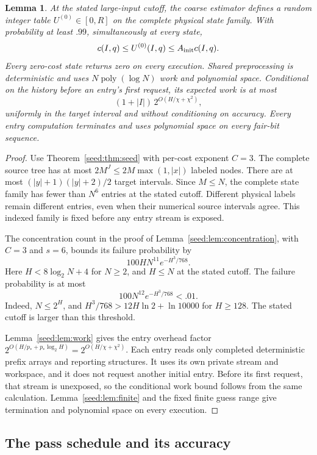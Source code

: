 \documentclass[11pt]{article}
\newtheorem{lemma}[theorem]{Lemma}
\theoremstyle{definition}
\newcommand{\1}{\mathbf 1}
\begin{document}
\begin{lemma}\label{core:lem:initial-seed}
At the stated large-input cutoff, the coarse estimator defines a random
integer table $U^{(0)}\in[0,R]$ on the complete physical state family.
With probability at least $.99$, simultaneously at every state,
\[
 c(I,q)\le U^{(0)}(I,q)\le A_{\rm init}c(I,q).
\]
Every zero-cost state returns zero on every execution.
Shared preprocessing is deterministic and uses
$N\operatorname{poly}(\log N)$ work and polynomial space.
Conditional on the history before an entry's first request, its expected
work is at most
\[
 (1+|I|)\,2^{O(H/\chi+\chi^2)},
\]
uniformly in the target interval and without conditioning on accuracy.
Every entry computation terminates and uses polynomial space on every
fair-bit sequence.
\end{lemma}
\begin{proof}
Use Theorem~\ref{seed:thm:seed} with per-cost exponent $C=3$.
The complete source tree has at most
$2M^J\le2M\max(1,|x|)$ labeled nodes. There are at most
$(|y|+1)(|y|+2)/2$ target intervals.
Since $M\le N$, the complete state family has fewer than $N^6$ entries
at the stated cutoff. Different physical labels remain different
entries, even when their numerical source intervals agree.
This indexed family is fixed before any entry stream is exposed.

The concentration count in the proof of
Lemma~\ref{seed:lem:concentration}, with $C=3$ and $s=6$, bounds its failure
probability by
\[
 100HN^{11}e^{-H^3/768}.
\]
Here $H<8\log_2N+4$ for $N\ge2$, and $H\le N$ at the stated cutoff.
The failure probability is at most
\[
 100N^{12}e^{-H^3/768}<.01.
\]
Indeed, $N\le2^H$, and
$H^3/768>12H\ln2+\ln10000$ for $H\ge128$.
The stated cutoff is larger than this threshold.

Lemma~\ref{seed:lem:work} gives the entry overhead factor
$2^{O(H/p_*+p_*\log_2H)}=2^{O(H/\chi+\chi^2)}$.
Each entry reads only completed deterministic prefix arrays and reporting
structures. It uses its own private stream and workspace, and it does
not request another initial entry. Before its first request, that stream
is unexposed, so the conditional work bound follows from the same
calculation. Lemma~\ref{seed:lem:finite} and the fixed finite guess range
give termination and polynomial space on every execution.
\end{proof}

\subsection{The pass schedule and its accuracy}
\label{refine:sec:assembly-proof}
\end{document}
